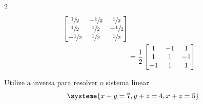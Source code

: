 \documentclass[a4paper,12pt,fleqn]{article}
\begin{document}
\begin{answer}
\begin{multicols}{2}
\begin{align*}
\begin{bmatrix}
    \sfrac{1}{2}  & -\sfrac{1}{2} & \sfrac{1}{2}  \\
    \sfrac{1}{2}  & \sfrac{1}{2}  & -\sfrac{1}{2} \\
    -\sfrac{1}{2} & \sfrac{1}{2}  & \sfrac{1}{2}
  \end{bmatrix}
  \\
  & = \frac{1}{2}
  \begin{bmatrix}
     1 & -1 &  1 \\
     1 &  1 & -1 \\
    -1 &  1 &  1
  \end{bmatrix}
\end{align*}
\end{multicols}
\end{answer}

Utilize a inversa para resolver o sistema linear
\[
  \systeme{
  x + y = 7,
  y + z = 4,
  x + z = 5
  }
\]
\end{document}
